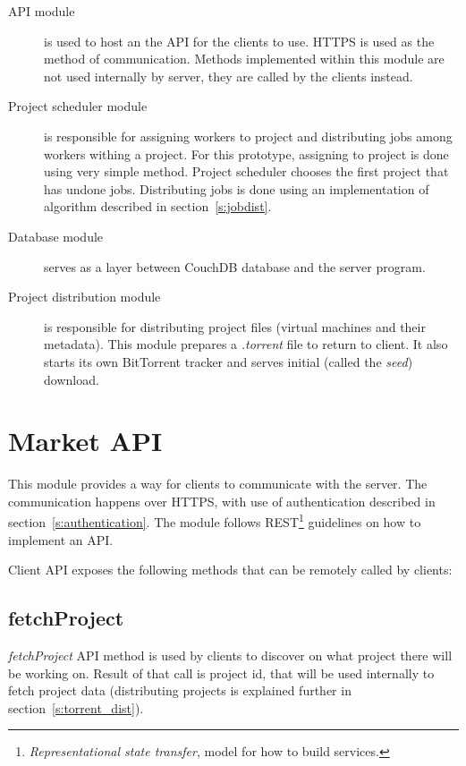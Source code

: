 \begin{description}

\item[API module] is used to host an the API for the clients to use. HTTPS is used as the method of communication. Methods implemented within this module are not used internally by server, they are called by the clients instead.

\item[Project scheduler module] is responsible for assigning workers to project and distributing jobs among workers withing a project. For this prototype, assigning to project is done using very simple method. Project scheduler chooses the first project that has undone jobs. Distributing jobs is done using an implementation of algorithm described in section~\ref{s:jobdist}.

\item[Database module] serves as a layer between CouchDB database and the server program.

\item[Project distribution module] is responsible for distributing project files (virtual machines and their metadata). This module prepares a \emph{.torrent} file to return to client. It also starts its own BitTorrent tracker and serves initial (called the \emph{seed}) download.

\end{description}

\section{Market API}
\label{s:cliapi}

This module provides a way for clients to communicate with the server. The communication happens over HTTPS, with use of authentication described in section~\ref{s:authentication}. The module follows REST\footnote{\emph{Representational state transfer}, model for how to build services.} guidelines on how to implement an API.

Client API exposes the following methods that can be remotely called by clients:

\subsection{fetchProject}

\emph{fetchProject} API method is used by clients to discover on what project there will be working on. Result of that call is project id, that will be used internally to fetch project data (distributing projects is explained further in section~\ref{s:torrent_dist}).

